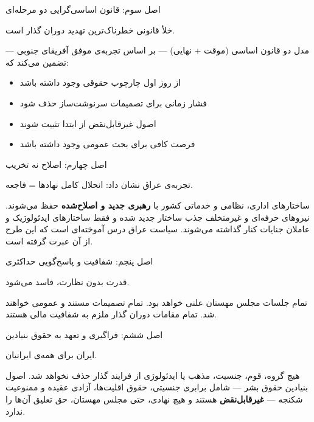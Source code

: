 \begin{principlebox}{اصل سوم: قانون اساسی‌گرایی دو مرحله‌ای}
	\begin{quotebox}
		خلأ قانونی خطرناک‌ترین تهدید دوران گذار است.
	\end{quotebox}
	
	مدل دو قانون اساسی (موقت + نهایی) --- بر اساس تجربه‌ی موفق آفریقای جنوبی ---
	تضمین می‌کند که:
	\begin{itemize}
		\item از روز اول چارچوب حقوقی وجود داشته باشد
		\item فشار زمانی برای تصمیمات سرنوشت‌ساز حذف شود
		\item اصول غیرقابل‌نقض از ابتدا تثبیت شوند
		\item فرصت کافی برای بحث عمومی وجود داشته باشد
	\end{itemize}
\end{principlebox}

\begin{principlebox}{اصل چهارم: اصلاح نه تخریب}
	\begin{quotebox}
		تجربه‌ی عراق نشان داد: انحلال کامل نهادها = فاجعه.
	\end{quotebox}
	
	ساختارهای اداری، نظامی و خدماتی کشور با \textbf{رهبری جدید و اصلاح‌شده} حفظ می‌شوند.
	نیروهای حرفه‌ای و غیرمتخلف جذب ساختار جدید شده و فقط ساختارهای ایدئولوژیک و عاملان
	جنایات کنار گذاشته می‌شوند. سیاست  عراق درس آموخته‌ای است
	که این طرح از آن عبرت گرفته است.
\end{principlebox}

\begin{principlebox}{اصل پنجم: شفافیت و پاسخ‌گویی حداکثری}
	\begin{quotebox}
		قدرت بدون نظارت، فاسد می‌شود.
	\end{quotebox}
	
	تمام جلسات مجلس مهستان علنی خواهد بود. تمام تصمیمات مستند و عمومی خواهند شد.
	تمام مقامات دوران گذار ملزم به شفافیت مالی هستند.
\end{principlebox}

\begin{principlebox}{اصل ششم: فراگیری و تعهد به حقوق بنیادین}
	\begin{quotebox}
		ایران برای همه‌ی ایرانیان.
	\end{quotebox}
	
	هیچ گروه، قوم، جنسیت، مذهب یا ایدئولوژی از فرایند گذار حذف نخواهد شد. اصول بنیادین
	حقوق بشر --- شامل برابری جنسیتی، حقوق اقلیت‌ها، آزادی عقیده و ممنوعیت شکنجه ---
	\textbf{غیرقابل‌نقض} هستند و هیچ نهادی، حتی مجلس مهستان، حق تعلیق آن‌ها را ندارد.
\end{principlebox}

